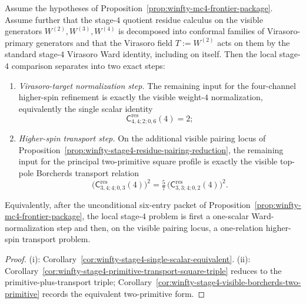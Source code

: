 \begin{proposition}
\label{prop:winfty-stage4-local-reduction-order}
Assume the hypotheses of
Proposition~\ref{prop:winfty-mc4-frontier-package}. Assume further
that the stage-$4$ quotient residue calculus on the visible generators
\(W^{(2)},W^{(3)},W^{(4)}\) is decomposed into conformal families of
Virasoro-primary generators and that the Virasoro field \(T:=W^{(2)}\)
acts on them by the standard stage-$4$ Virasoro Ward identity,
including on itself. Then the local stage-$4$ comparison separates
into two exact steps:
\begin{enumerate}[label=\textup{(\roman*)}]
\item \emph{Virasoro-target normalization step.}
 The remaining input for the four-channel higher-spin refinement is
 exactly the visible weight-$4$ normalization, equivalently the single
 scalar identity
 \[
 \mathsf{C}^{\mathrm{res}}_{4,4;2;0,6}(4)=2;
 \]
\item \emph{Higher-spin transport step.}
 On the additional visible pairing locus of
 Proposition~\ref{prop:winfty-stage4-residue-pairing-reduction}, the
 remaining input for the principal two-primitive square profile is
 exactly the visible top-pole Borcherds transport relation
 \[
 \bigl(\mathsf{C}^{\mathrm{res}}_{3,4;4;0,3}(4)\bigr)^2
 =
 \tfrac{5}{7}\,
 \bigl(\mathsf{C}^{\mathrm{res}}_{3,3;4;0,2}(4)\bigr)^2.
 \]
\end{enumerate}
Equivalently, after the unconditional six-entry packet of
Proposition~\ref{prop:winfty-mc4-frontier-package}, the local
stage-$4$ problem is first a one-scalar Ward-normalization step and
then, on the visible pairing locus, a one-relation higher-spin
transport problem.
\end{proposition}

\begin{proof}
\textup{(i)}: Corollary~\ref{cor:winfty-stage4-single-scalar-equivalent}. \textup{(ii)}: Corollary~\ref{cor:winfty-stage4-primitive-transport-square-triple} reduces to the primitive-plus-transport triple; Corollary~\ref{cor:winfty-stage4-visible-borcherds-two-primitive} records the equivalent two-primitive form.
\end{proof}


